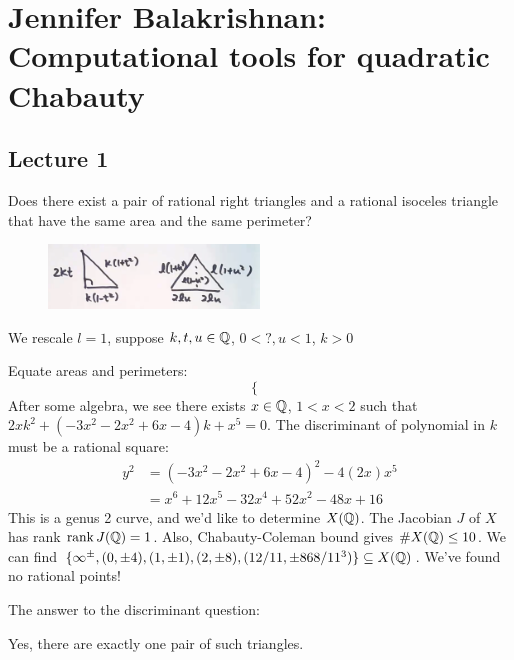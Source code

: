 \newpage
\section{Jennifer Balakrishnan: Computational tools for quadratic Chabauty}
\subsection{Lecture 1}

\begin{ques}
Does there exist a pair of rational right triangles and a rational isoceles triangle that have the same area and the same perimeter?
\end{ques}

	\begin{figure}[!ht]
	\centering
	\includegraphics[width=0.5\textwidth]{../images/im4.png}
	\end{figure}

We rescale $l=1$, suppose $k,t,u \in \mathbb{Q}$, $0<?,u<1$, $k>0$

Equate areas and perimeters:
	\[
	\begin{cases}
	
	\end{cases}
	\]
After some algebra, we see there exists $x \in \mathbb{Q}$, $1<x<2$ such that $2xk^2+(-3x^2-2x^2+6x-4)k+x^5= 0$. The discriminant of polynomial in $k$ must be a rational square:
	\[
	\begin{aligned}
	y^2&= (-3x^2-2x^2+6x-4)^2-4(2x)x^5 \\
	&=x^6+12x^5-32x^4+52x^2-48x+16
	\end{aligned}
	\]
This is a genus 2 curve, and we'd like to determine $X(\mathbb{Q})$. The Jacobian $J$ of $X$ has rank $\operatorname{rank} J(\mathbb{Q})=1$. Also, Chabauty-Coleman bound gives $\#X(\mathbb{Q}) \leq 10$. We can find $\{\infty^\pm, (0,\pm 4), (1,\pm 1), (2, \pm 8), (12/11,\pm 868/11^3) \} \subseteq X(\mathbb{Q})$. We've found no rational points!


The answer to the discriminant question:


\begin{thm}
Yes, there are exactly one pair of such triangles.
\end{thm}



